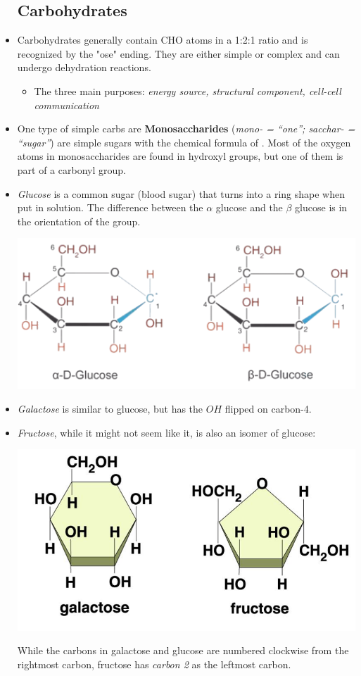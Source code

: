 \documentclass[letterpaper]{article}
\numberwithin{equation}{section}
\theoremstyle{classic}
\begin{document}
\begin{itemize}
    \subsection{Carbohydrates}
    \item Carbohydrates generally contain CHO atoms in a 1:2:1 ratio and is recognized by the "ose" ending. They are either simple or complex and can undergo dehydration reactions.
    \begin{itemize}
        \item The three main purposes: \textit{energy source, structural component, cell-cell communication}
    \end{itemize}
    \item One type of simple carbs are \textbf{Monosaccharides} (\textit{mono- = “one”; sacchar- = “sugar”}) are simple sugars with the chemical formula of . Most of the oxygen atoms in monosaccharides are found in hydroxyl groups, but one of them is part of a carbonyl group. 
    \item \textit{Glucose} is a common sugar (blood sugar) that turns into a ring shape when put in solution. The difference between the $\alpha$ glucose and the $\beta$ glucose is in the orientation of the  group.
    \begin{center}\includegraphics[width=0.6\linewidth]{A2.png}\end{center}
    \item \textit{Galactose} is similar to glucose, but has the $OH$ flipped on carbon-4.
    \item \textit{Fructose}, while it might not seem like it, is also an isomer of glucose:
    \begin{center}\includegraphics[width=0.6\linewidth]{A4.png}\end{center}
    While the carbons in galactose and glucose are numbered clockwise from the rightmost carbon, fructose has \textit{carbon 2} as the leftmost carbon.


\end{itemize}
\end{document}
